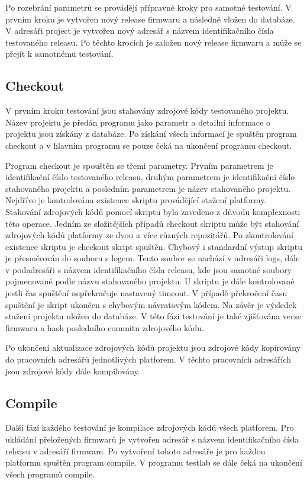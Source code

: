 Po rozebrání parametrů se provádějí přípravné kroky pro samotné testování. V prvním kroku je vytvořen nový release firmwaru a následně vložen do databáze. V adresáři project je vytvořen nový adresář s názvem identifikačního čísla testovaného releasu. Po těchto krocích je založen nový release firmwaru a může se přejít k samotnému testování.

\subsection{Checkout}
V prvním kroku testování jsou stahovány zdrojové kódy testovaného projektu. Název projektu je předán programu jako parametr a detailní informace o projektu jsou získány z databáze. Po získání všech informací je spuštěn program checkout  a v hlavním programu se pouze čeká na ukončení programu checkout.

Program checkout je spouštěn se třemi parametry. Prvním parametrem je identifikační číslo testovaného releasu, druhým parametrem je identifikační číslo stahovaného projektu a posledním parametrem je název stahovaného projektu. Nejdříve je kontrolována existence skriptu provádějící stažení platformy. Stahování zdrojových kódů pomocí skriptu bylo zavedeno z důvodu komplexnosti této operace. Jedním ze složitějších případů checkout skriptu může být stahování zdrojových kódů platformy ze dvou a více různých repozitářů. Po zkontrolování existence skriptu je checkout skript spuštěn. Chybový i standardní výstup skriptu je přesměrován do souboru s logem. Tento soubor se nachází v adresáři logs, dále v podadresáři s názvem identifikačního čísla releasu, kde jsou samotné soubory pojmenované podle názvu stahovaného projektu. U skriptu je dále kontrolované jestli čas spuštění nepřekračuje nastavený timeout. V případě překročení času spuštění je skript ukončen s chybovým návratovým kódem. Na závěr je výsledek stažení projektu uložen do databáze. V této fázi testování je také zjišťována verze firmwaru a hash posledního commitu zdrojového kódu.

Po ukončení aktualizace zdrojových kódů projektu jsou zdrojové kódy kopírovány do pracovních adresářů jednotlivých platforem. V těchto pracovních adresářích jsou zdrojové kódy dále kompilovány.

\subsection{Compile}
Další fází každého testování je kompilace zdrojových kódů všech platforem. Pro ukládání přeložených firmwarů je vytvořen adresář s názvem identifikačního čísla releasu v adresáří firmware. Po vytvoření tohoto adresáře je pro každou platformu spuštěn program compile. V programu testlab se dále čeká na ukončení všech programů compile.

